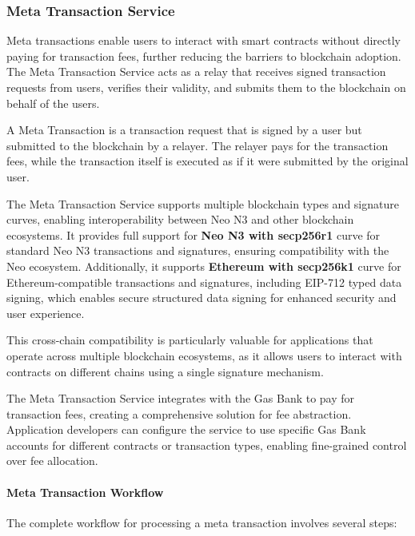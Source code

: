 \documentclass[12pt,a4paper]{article}
\begin{document}
\subsubsection{Meta Transaction Service}
\label{subsubsec:meta-tx}

Meta transactions enable users to interact with smart contracts without directly paying for transaction fees, further reducing the barriers to blockchain adoption. The Meta Transaction Service acts as a relay that receives signed transaction requests from users, verifies their validity, and submits them to the blockchain on behalf of the users.



\begin{definition}
A Meta Transaction is a transaction request that is signed by a user but submitted to the blockchain by a relayer. The relayer pays for the transaction fees, while the transaction itself is executed as if it were submitted by the original user.
\end{definition}

The Meta Transaction Service supports multiple blockchain types and signature curves, enabling interoperability between Neo N3 and other blockchain ecosystems. It provides full support for \textbf{Neo N3 with secp256r1} curve for standard Neo N3 transactions and signatures, ensuring compatibility with the Neo ecosystem. Additionally, it supports \textbf{Ethereum with secp256k1} curve for Ethereum-compatible transactions and signatures, including EIP-712 typed data signing, which enables secure structured data signing for enhanced security and user experience.

This cross-chain compatibility is particularly valuable for applications that operate across multiple blockchain ecosystems, as it allows users to interact with contracts on different chains using a single signature mechanism.

The Meta Transaction Service integrates with the Gas Bank to pay for transaction fees, creating a comprehensive solution for fee abstraction. Application developers can configure the service to use specific Gas Bank accounts for different contracts or transaction types, enabling fine-grained control over fee allocation.



\paragraph{Meta Transaction Workflow}
The complete workflow for processing a meta transaction involves several steps:
\end{document}
